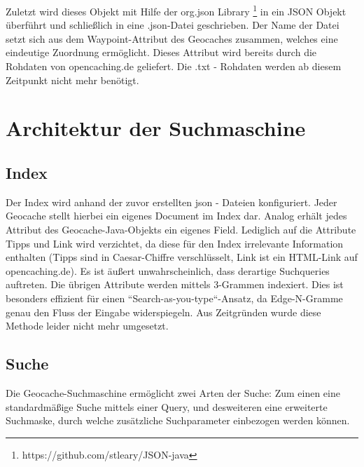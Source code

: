 \documentclass[11pt,a4paper]{scrreprt}
\begin{document}
Zuletzt wird dieses Objekt mit Hilfe der org.json Library \footnote{https://github.com/stleary/JSON-java} in ein JSON Objekt überführt und schließlich in eine .json-Datei geschrieben. Der Name der Datei setzt sich aus dem Waypoint-Attribut des Geocaches zusammen, welches eine eindeutige Zuordnung ermöglicht. Dieses Attribut wird bereits durch die Rohdaten von opencaching.de geliefert.
Die .txt - Rohdaten werden ab diesem Zeitpunkt nicht mehr benötigt.

\section{Architektur der Suchmaschine}

\subsection{Index} \label{index}
Der Index wird anhand der zuvor erstellten json - Dateien konfiguriert. Jeder Geocache stellt hierbei ein eigenes Document im Index dar. Analog erhält jedes Attribut des Geocache-Java-Objekts ein eigenes Field. Lediglich auf die Attribute Tipps und Link wird verzichtet, da diese für den Index irrelevante Information enthalten (Tipps sind in Caesar-Chiffre verschlüsselt, Link ist ein HTML-Link auf opencaching.de). Es ist äußert unwahrscheinlich, dass derartige Suchqueries auftreten. Die übrigen Attribute werden mittels 3-Grammen indexiert. Dies ist besonders effizient für einen ``Search-as-you-type``-Ansatz, da Edge-N-Gramme genau den Fluss der Eingabe widerspiegeln. Aus Zeitgründen wurde diese Methode leider nicht mehr umgesetzt.

\subsection{Suche}
 Die Geocache-Suchmaschine ermöglicht zwei Arten der Suche: Zum einen eine standardmäßige Suche mittels einer Query, und desweiteren eine erweiterte Suchmaske, durch welche zusätzliche Suchparameter einbezogen werden können.
\end{document}
